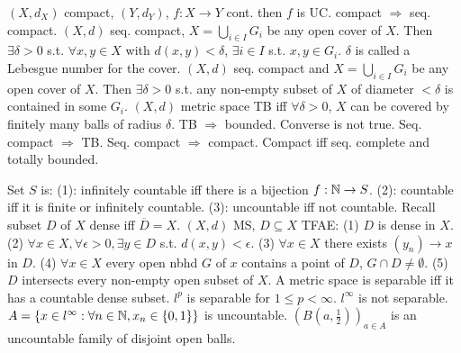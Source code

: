  $(X, d_X)$ compact, $(Y, d_Y)$, $f: X \to Y$ cont. then $f$ is UC.
 compact $\Rightarrow$ seq. compact.
 $(X,d)$ seq. compact, $X = \bigcup_{i \in I} G_i$ be any open cover of $X$.
Then $\exists \delta > 0$ s.t.
$\forall x,y \in X$ with $d(x,y) < \delta$, $\exists i \in I$ s.t. $x,y \in G_i$.
$\delta$ is called a Lebesgue number for the cover.
 $(X,d)$ seq. compact and $X = \bigcup_{i \in I} G_i$ be any open cover of $X$.
Then $\exists \delta > 0$ s.t.
any non-empty subset of $X$ of diameter $< \delta$ is contained in some $G_i$.
 $(X,d)$ metric space TB iff $\forall \delta > 0$,
$X$ can be covered by finitely many balls of radius $\delta$.
TB $\Rightarrow$ bounded.
Converse is not true.
 Seq. compact $\Rightarrow$ TB.
 Seq. compact $\Rightarrow$ compact.
 Compact iff seq. complete and totally bounded.

 Set $S$ is:
(1): infinitely countable iff there is a bijection $f: \mathbb{N} \to S$.
(2): countable iff it is finite or infinitely countable.
(3): uncountable iff not countable.
\wde{} Recall subset $D$ of $X$ dense iff $\overline{D} = X$.
 $(X,d)$ MS, $D \subseteq X$ TFAE:
(1) $D$ is dense in $X$.
(2) $\forall x \in X, \forall \epsilon > 0, \exists y \in D$ s.t. $d(x,y) < \epsilon$.
(3) $\forall x \in X$ there exists $(y_n) \to x$ in $D$.
(4) $\forall x \in X$ every open nbhd $G$ of $x$ contains a point of $D$, $G \cap D \neq \emptyset$.
(5) $D$ intersects every non-empty open subset of $X$.
 A metric space is separable iff it has a countable dense subset.
 $l^p$ is separable for $1 \leq p < \infty$.
 $l^\infty$ is not separable.
$A = \{x \in l^\infty : \forall n \in \mathbb{N}, x_n \in \{0,1\}\}$ is uncountable.
$(B(a, \frac{1}{2}))_{a \in A}$ is an uncountable family of disjoint open balls.
